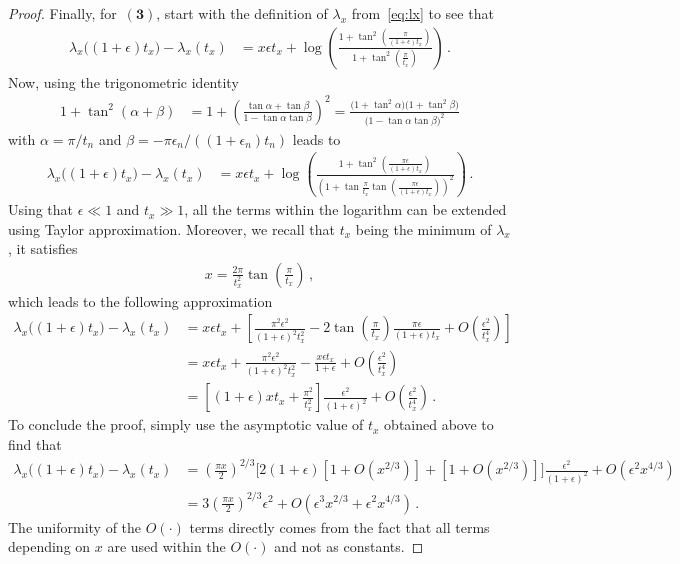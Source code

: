\documentclass{article}
\newcommand{\1}{\mathbbm{1}}								%
\theoremstyle{definition}
\numberwithin{equation}{section}
\newcommand{\numitem}[1]{$\mathbf{(#1)}$}
\begin{document}
\begin{proof}
    Finally, for~\numitem{3}, start with the definition of $\lambda_x$ from~\eqref{eq:lx} to see that
    \begin{align*}
        \lambda_x\big((1+\epsilon)t_x\big)-\lambda_x(t_x)&=x\epsilon t_x+\log\left(\frac{1+\tan^2\left(\frac{\pi}{(1+\epsilon)t_x}\right)}{1+\tan^2\left(\frac{\pi}{t_x}\right)}\right)\,.
    \end{align*}
    Now, using the trigonometric identity
    \begin{align*}
        1+\tan^2(\alpha+\beta)&=1+\left(\frac{\tan\alpha+\tan\beta}{1-\tan\alpha\tan\beta}\right)^2=\frac{\big(1+\tan^2\alpha\big)\big(1+\tan^2\beta\big)}{\big(1-\tan\alpha\tan\beta\big)^2}
    \end{align*}
    with $\alpha=\pi/t_n$ and $\beta=-\pi\epsilon_n/((1+\epsilon_n)t_n)$ leads to
    \begin{align*}
        \lambda_x\big((1+\epsilon)t_x\big)-\lambda_x(t_x)&=x\epsilon t_x+\log\left(\frac{1+\tan^2\left(\frac{\pi\epsilon}{(1+\epsilon)t_x}\right)}{\left(1+\tan\frac{\pi}{t_x}\tan\left(\frac{\pi\epsilon}{(1+\epsilon)t_x
        }\right)\right)^2}\right)\,.
    \end{align*}
    Using that $\epsilon\ll1$ and $t_x\gg1$, all the terms within the logarithm can be extended using Taylor approximation.
    Moreover, we recall that $t_x$ being the minimum of $\lambda_x$, it satisfies
    \begin{align*}
        x=\frac{2\pi}{t_x^2}\tan\left(\frac{\pi}{t_x}\right)\,,
    \end{align*}
    which leads to the following approximation
    \begin{align*}
        \lambda_x\big((1+\epsilon)t_x\big)-\lambda_x(t_x)&=x\epsilon t_x+\left[\frac{\pi^2\epsilon^2}{(1+\epsilon)^2t_x^2}-2\tan\left(\frac{\pi}{t_x}\right)\frac{\pi\epsilon}{(1+\epsilon)t_x}+O\left(\frac{\epsilon^2}{t_x^4}\right)\right]\\
        &=x\epsilon t_x+\frac{\pi^2\epsilon^2}{(1+\epsilon)^2t_x^2}-\frac{x\epsilon t_x}{1+\epsilon}+O\left(\frac{\epsilon^2}{t_x^4}\right)\\
        &=\left[(1+\epsilon)xt_x+\frac{\pi^2}{t_x^2}\right]\frac{\epsilon^2}{(1+\epsilon)^2}+O\left(\frac{\epsilon^2}{t_x^4}\right)\,.
    \end{align*}
    To conclude the proof, simply use the asymptotic value of $t_x$ obtained above to find that
    \begin{align*}
        \lambda_x\big((1+\epsilon)t_x\big)-\lambda_x(t_x)&=\left(\frac{\pi x}{2}\right)^{2/3}\bigg[2(1+\epsilon)\left[1+O\left(x^{2/3}\right)\right]+\left[1+O\left(x^{2/3}\right)\right]\bigg]\frac{\epsilon^2}{(1+\epsilon)^2}+O\left(\epsilon^2x^{4/3}\right)\\
        &=3\left(\frac{\pi x}{2}\right)^{2/3}\epsilon^2+O\left(\epsilon^3x^{2/3}+\epsilon^2x^{4/3}\right)\,.
    \end{align*}
    The uniformity of the $O(\cdot)$ terms directly comes from the fact that all terms depending on $x$ are used within the $O(\cdot)$ and not as constants.
\end{proof}
\end{document}
